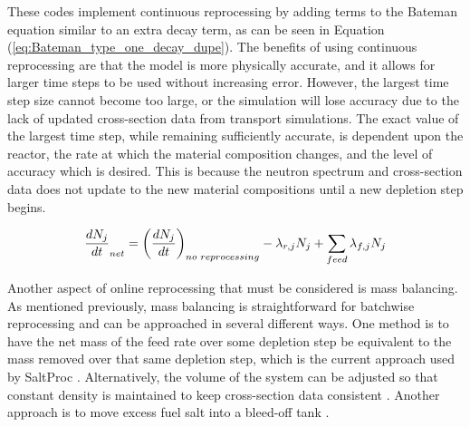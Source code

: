 These codes implement continuous reprocessing by adding terms to the Bateman equation similar to an extra decay term, as can be seen in Equation (\ref{eq:Bateman_type_one_decay_dupe}). The benefits of using continuous reprocessing are that the model is more physically accurate, and it allows for larger time steps to be used without increasing error. However, the largest time step size cannot become too large, or the simulation will lose accuracy due to the lack of updated cross-section data from transport simulations.
The exact value of the largest time step, while remaining sufficiently accurate, is dependent upon the reactor, the rate at which the material composition changes, and the level of accuracy which is desired.
This is because the neutron spectrum and cross-section data does not update to the new material compositions until a new depletion step begins.


\begin{equation} \hfill
\frac{dN_j}{dt}_{net} =\left( \frac{dN_j}{dt} \right)_{no\text{ }reprocessing} -  \lambda_{r, j} N_j + \sum_{feed} \lambda _{f, j} N_j
\hfill\label{eq:Bateman_type_one_decay_dupe} \end{equation}


Another aspect of online reprocessing that must be considered is mass balancing.
As mentioned previously, mass balancing is straightforward for batchwise reprocessing and can be approached in several different ways.
One method is to have the net mass of the feed rate over some depletion step be equivalent to the mass removed over that same depletion step, which is the current approach used by SaltProc \cite{rykhlevskii_modeling_2019}.
Alternatively, the volume of the system can be adjusted so that constant density is maintained to keep cross-section data consistent \cite{ridley_method_2017}. Another approach is to move excess fuel salt into a bleed-off tank \cite{ridley_method_2017}.

